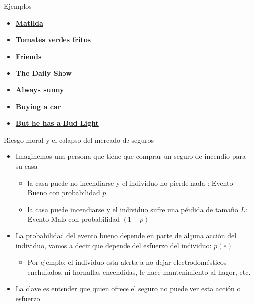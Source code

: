 \documentclass{beamer}
\begin{document}
\begin{frame}{Ejemplos}
    \begin{itemize}
    \item \href{https://www.youtube.com/watch?v=qlg0qakJhKU}{\textbf{Matilda}}
    \item \href{https://www.youtube.com/watch?v=akA8co61He4}{\textbf{Tomates verdes fritos}}
    \item \href{https://www.youtube.com/watch?v=X8BPfLhH6MA}{\textbf{Friends}}
    \item \href{https://videos.criticalcommons.org/media/encoded/16/jtierney86/43ba1b1ac3e94df3974f987cc912ae_Hxgbfl1.mp4}{\textbf{The Daily Show}}
    \item \href{http://videos.criticalcommons.org/transcoded/http/www.criticalcommons.org/Members/JJWooten/clips/always-sunny-paying-for-care/video_file/mp4-high/always-sunny-cost-of-care-mp4.mp4}{\textbf{Always sunny}}
    \item \href{https://www.youtube.com/watch?v=SrPu-xGrKrk}{\textbf{Buying a car}}
    \item \href{https://www.youtube.com/watch?v=ZZq0ShjEd-E}{\textbf{But he has a Bud Light}}
    \end{itemize}

\end{frame}


\begin{frame}{Riesgo moral y el colapso del mercado de seguros}
 \begin{itemize}
    \item Imaginemos una persona que tiene que comprar un seguro de incendio para su casa
    \begin{itemize}
    \item la casa puede no incendiarse y el individuo no pierde nada : Evento Bueno con probabilidad $p$
    \item la casa puede incendiarse y el individuo sufre una pérdida de tamaño $L$: Evento Malo con probabilidad $(1-p)$ 
    \end{itemize}
    \vspace{1mm}
    \item La probabilidad del evento bueno depende en parte de alguna acción del individuo, vamos a decir que depende del esfuerzo del individuo: $p(e)$
    \begin{itemize}
    \item Por ejemplo: el individuo esta alerta a no dejar electrodomésticos enchufados, ni hornallas encendidas, le hace mantenimiento al hagor, etc.
    \end{itemize}
    \item La clave es entender que quien ofrece el seguro no puede ver esta acción o esfuerzo
\end{itemize}
\end{frame}
\end{document}
